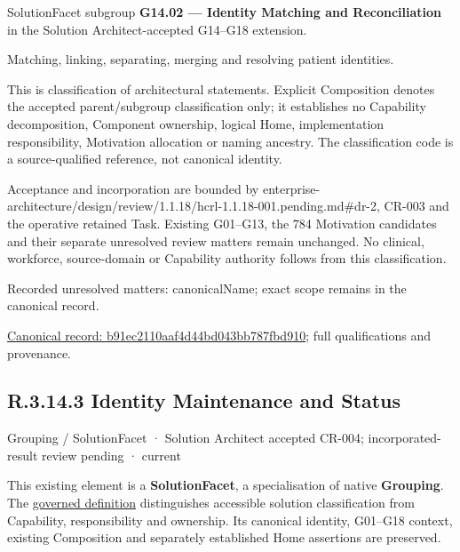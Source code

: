 SolutionFacet subgroup \textbf{G14.02 — Identity Matching and Reconciliation} in the Solution Architect-accepted G14–G18 extension.



Matching, linking, separating, merging and resolving patient identities.



This is classification of architectural statements. Explicit Composition denotes the accepted parent/subgroup classification only; it establishes no Capability decomposition, Component ownership, logical Home, implementation responsibility, Motivation allocation or naming ancestry. The classification code is a source-qualified reference, not canonical identity.



Acceptance and incorporation are bounded by enterprise-architecture/design/review/1.1.18/hcrl-1.1.18-001.pending.md\#dr-2, CR-003 and the operative retained Task. Existing G01–G13, the 784 Motivation candidates and their separate unresolved review matters remain unchanged. No clinical, workforce, source-domain or Capability authority follows from this classification.


{\small Recorded unresolved matters: canonicalName; exact scope remains in the canonical record.}\par
{\footnotesize \href{../../../../../../../continuum/grouping/b91ec2110aaf4d44bd043bb787fbd910.md}{Canonical record: b91ec2110aaf4d44bd043bb787fbd910}; full qualifications and provenance.}\par
\subsection*{R.3.14.3 Identity Maintenance and Status}
\label{navigation:R.3.14.3}

\label{element:801386f27cda458b8ce811f133d917e9}
{\small Grouping / SolutionFacet · Solution Architect accepted CR-004; incorporated-result review pending · current}\par

This existing element is a \textbf{SolutionFacet}, a specialisation of native
\textbf{Grouping}. The \href{\detokenize{../../../../../../../governance/continuum-representation.md#solutionfacet-classification--1119-candidate}}{governed definition}
distinguishes accessible solution classification from Capability, responsibility
and ownership. Its canonical identity, G01–G18 context, existing Composition
and separately established Home assertions are preserved.



